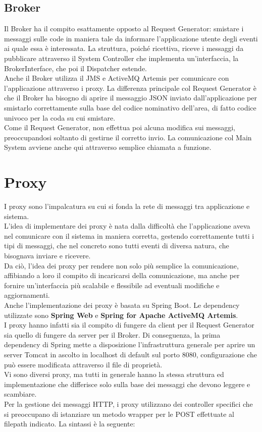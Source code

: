\subsection{Broker}
Il Broker ha il compito esattamente opposto al Request Generator: smistare i messaggi sulle code in maniera tale da informare l'applicazione utente degli eventi ai quale essa è interessata. 
La struttura, poiché ricettiva, riceve i messaggi da pubblicare attraverso il System Controller che implementa un'interfaccia, la BrokerInterface, che poi il Dispatcher estende. \vspace{0.5cm}
\\Anche il Broker utilizza il JMS e ActiveMQ Artemis per comunicare con l'applicazione attraverso i proxy. La differenza principale col Request Generator è che il Broker ha bisogno di aprire il messaggio JSON inviato dall'applicazione per smistarlo correttamente sulla base del codice nominativo dell'area, di fatto codice univoco per la coda su cui smistare.
\\Come il Request Generator, non effettua poi alcuna modifica sui messaggi, preoccupandosi soltanto di gestirne il corretto invio. La comunicazione col Main System avviene anche qui attraverso semplice chiamata a funzione. 

\section{Proxy}
I proxy sono l'impalcatura su cui si fonda la rete di messaggi tra applicazione e sistema. 
\\L'idea di implementare dei proxy è nata dalla difficoltà che l'applicazione aveva nel comunicare con il sistema in maniera corretta, gestendo correttamente tutti i tipi di messaggi, che nel concreto sono tutti eventi di diversa natura, che bisognava inviare e ricevere. 
\\Da ciò, l'idea dei proxy per rendere non solo più semplice la comunicazione, affibiando a loro il compito di incaricarsi della comunicazione, ma anche per fornire un'interfaccia più scalabile e flessibile ad eventuali modifiche e aggiornamenti. \vspace{0.5cm}
\\Anche l'implementazione dei proxy è basata su Spring Boot. Le dependency utilizzate sono \textbf{Spring Web} e \textbf{Spring for Apache ActiveMQ Artemis}. 
\\I proxy hanno infatti sia il compito di fungere da client per il Request Generator sia quello di fungere da server per il Broker. Di conseguenza, la prima dependency di Spring mette a disposizione l'infrastruttura generale per aprire un server Tomcat in ascolto in localhost di default sul porto 8080, configurazione che può essere modificata attraverso il file di proprietà.
\\Vi sono diversi proxy, ma tutti in generale hanno la stessa struttura ed implementazione che differisce solo sulla base dei messaggi che devono leggere e scambiare. \vspace{0.5cm}
\\Per la gestione dei messaggi HTTP, i proxy utilizzano dei controller specifici che si preoccupano di istanziare un metodo wrapper per le POST effettuate al filepath indicato. La sintassi è la seguente:

